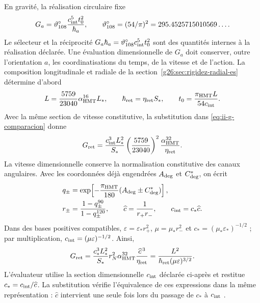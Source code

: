 En gravité, la réalisation circulaire fixe
\begin{equation}
 G_a=\vartheta_{108}^{\circ}\frac{c_{\rm int}^{5}t_0^2}{\hbar_a},
 \qquad
 \vartheta_{108}^{\circ}=(54/\pi)^2
 =295.4525715010569\ldots.
 \label{eq:ii-g-comparacion}
\end{equation}
Le sélecteur et la réciprocité \(G_a\hbar_a=
\vartheta_{108}^{\circ}c_{\rm int}^{5}t_0^2\) sont des quantités internes à
la réalisation déclarée. Une évaluation dimensionnelle de \(G_a\) doit
conserver, outre l’orientation \(a\), les coordinatisations du temps,
de la vitesse et de l’action. La composition longitudinale et radiale de la
section~\ref{g26:sec:rigidez-radial-es} détermine d’abord
\[
 L=\frac{5759}{23040}\alpha_{\mathrm{HMT}}^{16}L_*,\qquad
 \hbar_{\rm ret}=\eta_{\rm ret}S_*,\qquad
 t_0=\frac{\pi_{\mathrm{HMT}}L}{54c_{\rm int}}.
\]
Avec la même section de vitesse constitutive, la substitution dans
\eqref{eq:ii-g-comparacion} donne
\[
 G_{\rm ret}=\frac{c_{\rm int}^3L_*^2}{S_*}
 \left(\frac{5759}{23040}\right)^2
 \frac{\alpha_{\mathrm{HMT}}^{32}}{\eta_{\rm ret}}.
\]
La vitesse dimensionnelle conserve la normalisation constitutive des
canaux angulaires. Avec les coordonnées déjà engendrées \(A_{\rm deg}\)
et \(C^*_{\rm deg}\), on écrit
\begin{equation}
 \begin{aligned}
 q_\pm&=\exp\!\left[-\frac{\pi_{\mathrm{HMT}}}{180}
               (A_{\rm deg}\pm C^*_{\rm deg})\right],\\
 r_\pm&=\frac{1-q_\pm^{90}}{1-q_\pm^{120}},\qquad
 \widehat c=\frac1{r_+r_-},\qquad c_{\rm int}=c_*\widehat c.
 \end{aligned}
 \label{eq:ii-g26-velocidad-constitutiva}
\end{equation}
Dans des bases positives compatibles,
\(\varepsilon=\varepsilon_*r_+^2\), \(\mu=\mu_*r_-^2\) et
\(c_*=(\mu_*\varepsilon_*)^{-1/2}\) ; par multiplication,
\(c_{\rm int}=(\mu\varepsilon)^{-1/2}\). Ainsi,
\begin{equation}
 G_{\rm ret}=\frac{c_*^3L_*^2}{S_*}
 r_N^2\alpha_{\mathrm{HMT}}^{32}\frac{\widehat c^{\,3}}{\eta_{\rm ret}}
 =\frac{L^2}{\hbar_{\rm ret}(\mu\varepsilon)^{3/2}}.
 \label{eq:ii-g26-gravedad-constitutiva}
\end{equation}
L’évaluateur utilise la section dimensionnelle \(c_{\rm int}\)
déclarée ci-après et restitue \(c_*=c_{\rm int}/\widehat c\).
La substitution vérifie l’équivalence de ces expressions dans la même
représentation : \(\widehat c\) intervient une seule fois lors du passage de
\(c_*\) à \(c_{\rm int}\) \cite{hmtg26counter}.

